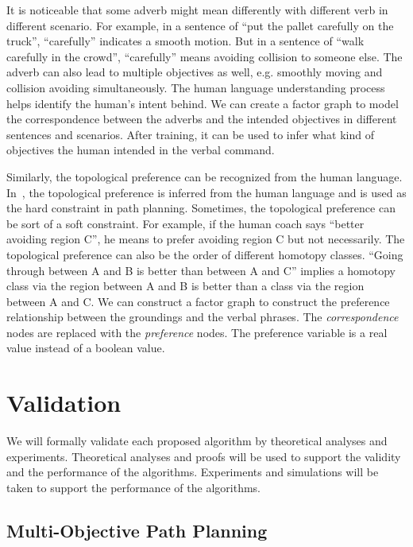 \documentclass[phd]{byuprop}
\begin{document}
It is noticeable that some adverb might mean differently with different verb in different scenario.
For example, in a sentence of ``put the pallet carefully on the truck'', ``carefully'' indicates a smooth motion. 
But in a sentence of ``walk carefully in the crowd'', ``carefully'' means avoiding collision to someone else.
The adverb can also lead to multiple objectives as well, e.g. smoothly moving and collision avoiding simultaneously.
The human language understanding process helps identify the human's intent behind.
We can create a factor graph to model the correspondence between the adverbs and the intended objectives in different sentences and scenarios.
After training, it can be used to infer what kind of objectives the human intended in the verbal command.

Similarly, the topological preference can be recognized from the human language.
In~\cite{howard2014natural}, the topological preference is inferred from the human language and is used as the hard constraint in path planning.
Sometimes, the topological preference can be sort of a soft constraint.
For example, if the human coach says ``better avoiding region C'', he means to prefer avoiding region C but not necessarily.
The topological preference can also be the order of different homotopy classes.
``Going through between A and B is better than between A and C'' implies a homotopy class via the region between A and B is better than a class via the region between A and C.
We can construct a factor graph to construct the preference relationship between the groundings and the verbal phrases.
The {\em correspondence} nodes are replaced with the {\em preference} nodes.
The preference variable is a real value instead of a boolean value.


\section{Validation}

We will formally validate each proposed algorithm by theoretical analyses and experiments.
Theoretical analyses and proofs will be used to support the validity and the performance of the algorithms.
Experiments and simulations will be taken to support the performance of the algorithms.

\subsection{Multi-Objective Path Planning}
\end{document}
